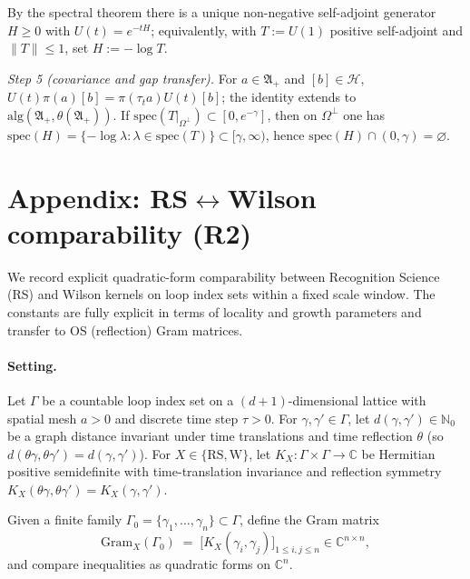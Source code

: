\documentclass[11pt]{amsart}
\begin{document}
By the spectral theorem there is a unique non-negative self-adjoint generator $H\ge 0$ with $U(t)=e^{-tH}$; equivalently, with $T:=U(1)$ positive self-adjoint and $\|T\|\le 1$, set $H:=-\log T$.

\emph{Step 5 (covariance and gap transfer).} For $a\in\mathfrak A_+$ and $[b]\in\mathcal H$, $U(t)\pi(a)[b]=\pi(\tau_t a)U(t)[b]$; the identity extends to $\mathrm{alg}(\mathfrak A_+,\theta(\mathfrak A_+))$. If $\mathrm{spec}(T|_{\Omega^\perp})\subset[0,e^{-\gamma}]$, then on $\Omega^\perp$ one has $\mathrm{spec}(H)=\{-\log\lambda: \lambda\in\mathrm{spec}(T)\}\subset[\gamma,\infty)$, hence $\mathrm{spec}(H)\cap(0,\gamma)=\varnothing$.

\section{Appendix: RS$\leftrightarrow$Wilson comparability (R2)}

We record explicit quadratic-form comparability between Recognition Science (RS) and Wilson kernels on loop index sets within a fixed scale window. The constants are fully explicit in terms of locality and growth parameters and transfer to OS (reflection) Gram matrices.

\paragraph{Setting.}
Let $\Gamma$ be a countable loop index set on a $(d{+}1)$-dimensional lattice with spatial mesh $a>0$ and discrete time step $\tau>0$. For $\gamma,\gamma'\in\Gamma$, let $d(\gamma,\gamma')\in\mathbb{N}_0$ be a graph distance invariant under time translations and time reflection $\theta$ (so $d(\theta\gamma,\theta\gamma')=d(\gamma,\gamma')$). For $X\in\{\mathrm{RS},\mathrm{W}\}$, let $K_X:\Gamma\times\Gamma\to\mathbb{C}$ be Hermitian positive semidefinite with time-translation invariance and reflection symmetry $K_X(\theta\gamma,\theta\gamma')=K_X(\gamma,\gamma')$.

Given a finite family $\Gamma_0=\{\gamma_1,\ldots,\gamma_n\}\subset\Gamma$, define the Gram matrix
\[
  \mathrm{Gram}_X(\Gamma_0)\;=\;\bigl[K_X(\gamma_i,\gamma_j)\bigr]_{1\le i,j\le n}\in\mathbb{C}^{n\times n},
\]
and compare inequalities as quadratic forms on $\mathbb{C}^n$.
\end{document}
